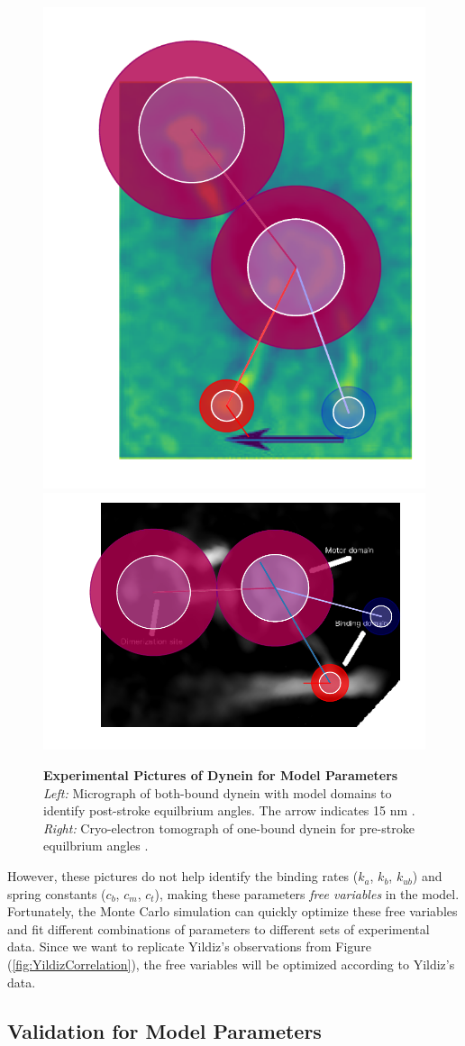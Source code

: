 \begin{figure}[hbt!]
	\centering
	\includegraphics[width=0.3\columnwidth]{../../plots/burgess-model-figure.pdf}
	\includegraphics[width=0.5\columnwidth]{../../plots/grotjahn-model-figure.pdf}%
	\caption[Experimental Pictures of Dynein for Model Parameters]{\textbf{Experimental Pictures of Dynein for Model Parameters} \textit{Left:} Micrograph of both-bound dynein with model domains to identify post-stroke equilbrium angles. The arrow indicates 15 nm \cite{Burgess2003}.  \textit{Right:} Cryo-electron tomograph of one-bound dynein for pre-stroke equilbrium angles \cite{grotjahn2018cryo}.} 
	\label{fig:ParamsPics}
\end{figure}

However, these pictures do not help identify the binding rates ($k_a$, $k_b$, $k_{ub}$) and spring constants ($c_b$, $c_m$, $c_t$), making these parameters \textit{free variables} in the model. Fortunately, the Monte Carlo simulation can quickly optimize these free variables and fit different combinations of parameters to  different sets of experimental data. Since we want to replicate Yildiz's observations from Figure (\ref{fig:YildizCorrelation}), the free variables will be optimized according to Yildiz's data. %

\subsection{Validation for Model Parameters}

